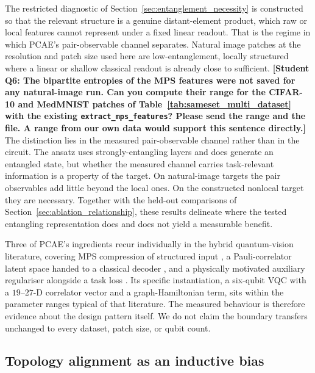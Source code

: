 \documentclass[pdflatex,sn-basic]{sn-jnl}
\DeclareRobustCommand{\blue}[1]{\leavevmode{\color{blue}#1}}
\begin{document}
The restricted diagnostic of Section~\ref{sec:entanglement_necessity} is constructed so that the relevant structure is a genuine distant-element product, which raw or local features cannot represent under a fixed linear readout. That is the regime in which PCAE's pair-observable channel separates. Natural image patches at the resolution and patch size used here are low-entanglement, locally structured \blue{data \citep{Martyn2020, Lu2025},} where a linear or shallow classical readout is already close to sufficient.
{\color{red}\textbf{[Student Q6: The bipartite entropies of the MPS features were not saved
for any natural-image run. Can you compute their range for the CIFAR-10 and
MedMNIST patches of Table~\ref{tab:sameset_multi_dataset} with the existing
\texttt{extract\_mps\_features}? Please send the range and the file. A range
from our own data would support this sentence directly.]}}
The distinction lies in the measured pair-observable channel rather than in the circuit. The ansatz uses strongly-entangling layers and does generate an entangled state, but whether the measured channel carries task-relevant information is a property of the target. On natural-image targets the pair observables add little beyond the local ones. On the constructed nonlocal target they are necessary. Together with the held-out comparisons of Section~\ref{sec:ablation_relationship}, these results delineate where the tested entangling representation does and does not yield a measurable benefit.

Three of PCAE's ingredients recur individually in the hybrid quantum-vision literature, covering MPS compression of structured input \citep{Stoudenmire2016, Han2018, Cirac2021, Guala2023}, a Pauli-correlator latent space handed to a classical decoder \citep{Havlicek2019}, and a physically motivated auxiliary regulariser alongside a task loss \citep{Shi2022}. Its specific instantiation, a six-qubit VQC with a $19$--$27$-D correlator vector and a graph-Hamiltonian term, sits within the parameter ranges typical of that literature. The measured behaviour is therefore evidence about the design pattern itself. We do not claim the boundary transfers unchanged to every dataset, patch size, or qubit count.

\subsection{Topology alignment as an inductive bias}
\label{sec:topology}
\end{document}
